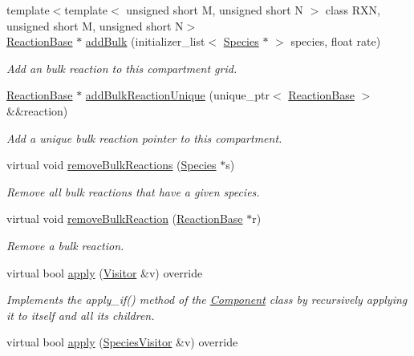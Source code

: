 \begin{DoxyCompactItemize}
{\footnotesize template$<$template$<$ unsigned short M, unsigned short N $>$ class R\+X\+N, unsigned short M, unsigned short N$>$ }\\\hyperlink{classReactionBase}{Reaction\+Base} $\ast$ \hyperlink{classCompartmentGrid_a6a10c77ee2f648af7c36956fdacf168b}{add\+Bulk} (initializer\+\_\+list$<$ \hyperlink{classSpecies}{Species} $\ast$ $>$ species, float rate)
\begin{DoxyCompactList}\small\item\em Add an bulk reaction to this compartment grid. \end{DoxyCompactList}\item 
\hyperlink{classReactionBase}{Reaction\+Base} $\ast$ \hyperlink{classCompartmentGrid_a280e136b6fea6d7a3d1ac781cb57cba1}{add\+Bulk\+Reaction\+Unique} (unique\+\_\+ptr$<$ \hyperlink{classReactionBase}{Reaction\+Base} $>$ \&\&reaction)
\begin{DoxyCompactList}\small\item\em Add a unique bulk reaction pointer to this compartment. \end{DoxyCompactList}\item 
virtual void \hyperlink{classCompartmentGrid_a8898f174519f416da6280ce1e0ecc448}{remove\+Bulk\+Reactions} (\hyperlink{classSpecies}{Species} $\ast$s)
\begin{DoxyCompactList}\small\item\em Remove all bulk reactions that have a given species. \end{DoxyCompactList}\item 
virtual void \hyperlink{classCompartmentGrid_a31f060cbf821397d7b8817359c410419}{remove\+Bulk\+Reaction} (\hyperlink{classReactionBase}{Reaction\+Base} $\ast$r)
\begin{DoxyCompactList}\small\item\em Remove a bulk reaction. \end{DoxyCompactList}\item 
virtual bool \hyperlink{classComposite_a58123ab346f6621a187bebe456e383ea}{apply} (\hyperlink{classVisitor}{Visitor} \&v) override
\begin{DoxyCompactList}\small\item\em Implements the apply\+\_\+if() method of the \hyperlink{classComponent}{Component} class by recursively applying it to itself and all its children. \end{DoxyCompactList}\item 
virtual bool \hyperlink{classComposite_a18937a1f6f84a159e77ba83dd34b2e20}{apply} (\hyperlink{classSpeciesVisitor}{Species\+Visitor} \&v) override

\end{DoxyCompactItemize}
